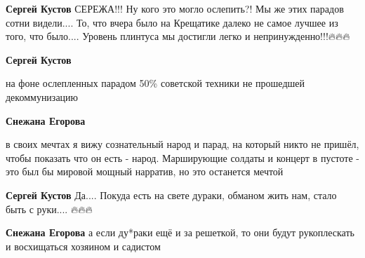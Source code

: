 \begin{itemize}
\begin{itemize}
\textbf{Сергей Кустов} СЕРЕЖА!!!
Ну кого это могло ослепить?!
Мы же этих парадов сотни видели....
То, что вчера было на Крещатике далеко не самое лучшее из того, что было....
Уровень плинтуса мы достигли легко и непринужденно!!!🔥🔥🔥

 
\textbf{Сергей Кустов} 

на фоне ослепленных парадом 50\% советской техники не прошедшей декоммунизацию

 
\textbf{Снежана Егорова} 

в своих мечтах я вижу сознательный народ и парад, на
который никто не пришёл, чтобы показать что он есть - народ. Марширующие
солдаты и концерт в пустоте - это был бы мировой мощный нарратив, но это
останется мечтой


 
\textbf{Сергей Кустов} Да....
Покуда есть на свете дураки, обманом жить нам, стало быть с руки....
🔥🔥🔥

 
\textbf{Снежана Егорова} а если ду*раки ещё и за решеткой, то они будут рукоплескать и восхищаться хозяином и садистом
\end{itemize}

 

\end{itemize}
